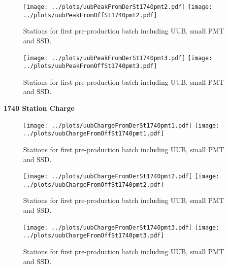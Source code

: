 \documentclass[twoside, final, 10pt]{articleMine}
\begin{document}
\begin{figure}[!tbh]
  \centering
  \subfigure
  {
    \texttt{[image: ../plots/uubPeakFromDerSt1740pmt2.pdf]}
    \texttt{[image: ../plots/uubPeakFromOffSt1740pmt2.pdf]}
  }
  \caption{Stations for first pre-production batch including UUB, small PMT and SSD.}
  \label{figChLowHigh}
\end{figure}

\begin{figure}[!tbh]
  \centering
  \subfigure
  {
    \texttt{[image: ../plots/uubPeakFromDerSt1740pmt3.pdf]}
    \texttt{[image: ../plots/uubPeakFromOffSt1740pmt3.pdf]}
  }
  \caption{Stations for first pre-production batch including UUB, small PMT and SSD.}
  \label{figChLowHigh}
\end{figure}
\clearpage


{\bf 1740 Station Charge}
\begin{figure}[!tbh]
  \centering
  \subfigure
  {
    \texttt{[image: ../plots/uubChargeFromDerSt1740pmt1.pdf]}
    \texttt{[image: ../plots/uubChargeFromOffSt1740pmt1.pdf]}
  }
  \caption{Stations for first pre-production batch including UUB, small PMT and SSD.}
  \label{figChLowHigh}
\end{figure}

\begin{figure}[!tbh]
  \centering
  \subfigure
  {
    \texttt{[image: ../plots/uubChargeFromDerSt1740pmt2.pdf]}
    \texttt{[image: ../plots/uubChargeFromOffSt1740pmt2.pdf]}
  }
  \caption{Stations for first pre-production batch including UUB, small PMT and SSD.}
  \label{figChLowHigh}
\end{figure}

\begin{figure}[!tbh]
  \centering
  \subfigure
  {
    \texttt{[image: ../plots/uubChargeFromDerSt1740pmt3.pdf]}
    \texttt{[image: ../plots/uubChargeFromOffSt1740pmt3.pdf]}
  }
  \caption{Stations for first pre-production batch including UUB, small PMT and SSD.}
  \label{figChLowHigh}
\end{figure}
\clearpage
\end{document}
